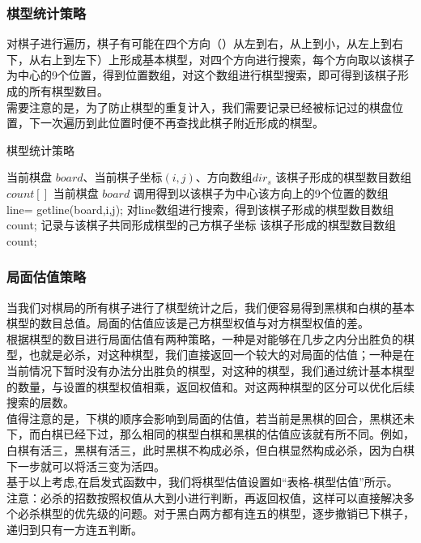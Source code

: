 \documentclass{acm_proc_article-sp}
\begin{document}
\subsubsection{\textbf{棋型统计策略}}
对棋子进行遍历，棋子有可能在四个方向（）从左到右，从上到小，从左上到右下，从右上到左下）上形成基本棋型，对四个方向进行搜索，每个方向取以该棋子为中心的9个位置，得到位置数组，对这个数组进行棋型搜索，即可得到该棋子形成的所有棋型数目。\\
需要注意的是，为了防止棋型的重复计入，我们需要记录已经被标记过的棋盘位置，下一次遍历到此位置时便不再查找此棋子附近形成的棋型。\\
\begin{tiny}
\begin{algorithm}
       \algsetup{\tiny}
       \scriptsize
	\caption{棋型统计策略}
	\begin{algorithmic}[1] %
		\Require  当前棋盘 $board$、当前棋子坐标$(i,j)$、方向数组$dir_s$
		\Ensure  该棋子形成的棋型数目数组$count[]$ 当前棋盘 $board$
	 	\State 调用得到以该棋子为中心该方向上的9个位置的数组  line= getline(board,i,j);
	 	\State 对line数组进行搜索，得到该棋子形成的棋型数目数组count;
	 	\State
	 	记录与该棋子共同形成棋型的己方棋子坐标
		\EndFor
		\State	\Return 该棋子形成的棋型数目数组count;
		\EndIf
		\EndFunction
	\end{algorithmic}
\end{algorithm}
\end{tiny}

\subsubsection{\textbf{局面估值策略}}
当我们对棋局的所有棋子进行了棋型统计之后，我们便容易得到黑棋和白棋的基本棋型的数目总值。局面的估值应该是己方棋型权值与对方棋型权值的差。\\
根据棋型的数目进行局面估值有两种策略，一种是对能够在几步之内分出胜负的棋型，也就是必杀，对这种棋型，我们直接返回一个较大的对局面的估值；一种是在当前情况下暂时没有办法分出胜负的棋型，对这种的棋型，我们通过统计基本棋型的数量，与设置的棋型权值相乘，返回权值和。对这两种棋型的区分可以优化后续搜索的层数。\\
值得注意的是，下棋的顺序会影响到局面的估值，若当前是黑棋的回合，黑棋还未下，而白棋已经下过，那么相同的棋型白棋和黑棋的估值应该就有所不同。例如，白棋有活三，黑棋有活三，此时黑棋不构成必杀，但白棋显然构成必杀，因为白棋下一步就可以将活三变为活四。\\
基于以上考虑,在启发式函数中，我们将棋型估值设置如“表格-棋型估值”所示。\\
注意：必杀的招数按照权值从大到小进行判断，再返回权值，这样可以直接解决多个必杀棋型的优先级的问题。对于黑白两方都有连五的棋型，逐步撤销已下棋子，递归到只有一方连五判断。\\
\end{document}
